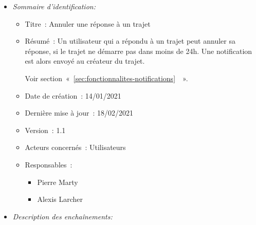 \begin{itemize}

\item \textit{Sommaire d'identification:}

\begin{itemize}

\item Titre~: Annuler une réponse à un trajet

\item Résumé~: Un utilisateur qui a répondu à un trajet peut annuler sa réponse, si le trajet ne démarre pas dans moins de 24h. 
Une notification est alors envoyé au créateur du trajet.

Voir section~«~\ref{sec:fonctionnalites-notifications}~~».

\item Date de création~: 14/01/2021

\item Dernière mise à jour~: 18/02/2021

\item Version~: 1.1

\item Acteurs concernés~: Utilisateurs

\item Responsables~:
\begin{itemize}
            \item Pierre Marty
            \item Alexis Larcher
        \end{itemize}

\end{itemize}

\item \textit{Description des enchaînements:}


\end{itemize}
